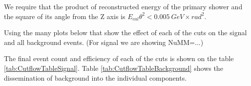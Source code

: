 We require that the product of reconstructed energy of the primary shower and the square of its angle from the Z axis is $E_{cal}\theta^2<0.005\ \unit{GeV\times rad^2}$.


Using the many plots below that show the effect of each of the cuts on the signal and all background events. (For signal we are showing NuMM=...)

The final event count and efficiency of each of the cuts is shown on the table \ref{tab:CutflowTableSignal}. Table \ref{tab:CutflowTableBackground} shows the dissemination of background into the individual components.

